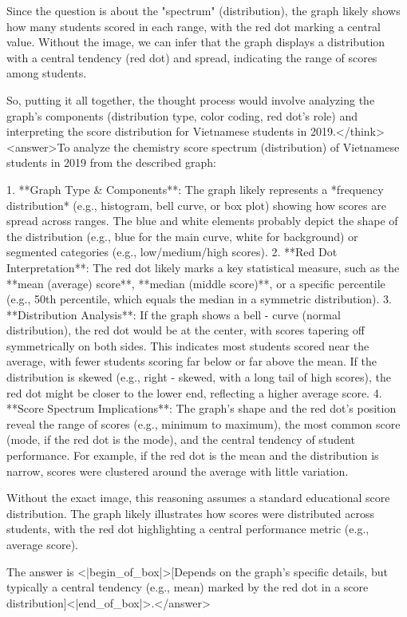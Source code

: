 Since the question is about the "spectrum" (distribution), the graph likely shows how many students scored in each range, with the red dot marking a central value. Without the image, we can infer that the graph displays a distribution with a central tendency (red dot) and spread, indicating the range of scores among students.

So, putting it all together, the thought process would involve analyzing the graph's components (distribution type, color coding, red dot's role) and interpreting the score distribution for Vietnamese students in 2019.</think><answer>To analyze the chemistry score spectrum (distribution) of Vietnamese students in 2019 from the described graph:  

1. **Graph Type & Components**: The graph likely represents a *frequency distribution* (e.g., histogram, bell curve, or box plot) showing how scores are spread across ranges. The blue and white elements probably depict the shape of the distribution (e.g., blue for the main curve, white for background) or segmented categories (e.g., low/medium/high scores).  
2. **Red Dot Interpretation**: The red dot likely marks a key statistical measure, such as the **mean (average) score**, **median (middle score)**, or a specific percentile (e.g., 50th percentile, which equals the median in a symmetric distribution).  
3. **Distribution Analysis**: If the graph shows a bell - curve (normal distribution), the red dot would be at the center, with scores tapering off symmetrically on both sides. This indicates most students scored near the average, with fewer students scoring far below or far above the mean. If the distribution is skewed (e.g., right - skewed, with a long tail of high scores), the red dot might be closer to the lower end, reflecting a higher average score.  
4. **Score Spectrum Implications**: The graph’s shape and the red dot’s position reveal the range of scores (e.g., minimum to maximum), the most common score (mode, if the red dot is the mode), and the central tendency of student performance. For example, if the red dot is the mean and the distribution is narrow, scores were clustered around the average with little variation.  


Without the exact image, this reasoning assumes a standard educational score distribution. The graph likely illustrates how scores were distributed across students, with the red dot highlighting a central performance metric (e.g., average score).  

The answer is <|begin_of_box|>[Depends on the graph’s specific details, but typically a central tendency (e.g., mean) marked by the red dot in a score distribution]<|end_of_box|>.</answer>